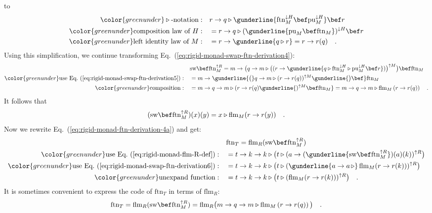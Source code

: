 to
\begin{align}
{\color{greenunder}\triangleright\text{-notation}:}\quad & r\rightarrow q\triangleright\gunderline{\text{ftn}_{M}^{\downarrow H}\bef\text{pu}_{M}^{\downarrow H}}\bef r\nonumber \\
{\color{greenunder}\text{composition law of }H:}\quad & =r\rightarrow q\triangleright(\gunderline{\text{pu}_{M}\bef\text{ftn}_{M}})^{\downarrow H}\bef r\nonumber \\
{\color{greenunder}\text{left identity law of }M:}\quad & =r\rightarrow\gunderline{q\triangleright r}=r\rightarrow r(q)\quad.\label{eq:rigid-monad-swap-ftn-derivation5}
\end{align}
Using this simplification, we continue transforming Eq.~(\ref{eq:rigid-monad-swap-ftn-derivation4}):
\begin{align*}
 & \text{sw}\bef\text{ftn}_{M}^{\uparrow R}=m\rightarrow\big(q\rightarrow m\triangleright\big((r\rightarrow\gunderline{q\triangleright\text{ftn}_{M}^{\downarrow H}\triangleright\text{pu}_{M}^{\downarrow H}\bef r})\big)^{\uparrow M}\big)\bef\text{ftn}_{M}\\
{\color{greenunder}\text{use Eq.~(\ref{eq:rigid-monad-swap-ftn-derivation5})}:}\quad & =m\rightarrow\gunderline{\big(}q\rightarrow m\triangleright(r\rightarrow r(q))^{\uparrow M}\gunderline{\big)\bef}\text{ftn}_{M}\\
{\color{greenunder}\text{composition}:}\quad & =m\rightarrow q\rightarrow m\triangleright(r\rightarrow r(q)\gunderline{)^{\uparrow M}\bef\text{ftn}_{M}}=m\rightarrow q\rightarrow m\triangleright\text{flm}_{M}\left(r\rightarrow r(q)\right)\quad.
\end{align*}
It follows that
\begin{equation}
(\text{sw}\bef\text{ftn}_{M}^{\uparrow R})(x)(y)=x\triangleright\text{flm}_{M}(r\rightarrow r(y))\quad.\label{eq:rigid-monad-swap-ftn-derivation6}
\end{equation}
Now we rewrite Eq.~(\ref{eq:rigid-monad-ftn-derivation-4a}) and
get:
\begin{align*}
 & \text{ftn}_{T}=\text{flm}_{R}(\text{sw}\bef\text{ftn}_{M}^{\uparrow R})\\
{\color{greenunder}\text{use Eq.~(\ref{eq:rigid-monad-flm-R-def})}:}\quad & =t\rightarrow k\rightarrow k\triangleright\big(t\triangleright(a\rightarrow(\gunderline{\text{sw}\bef\text{ftn}_{M}^{\uparrow R}})(a)(k))^{\uparrow R}\big)\\
{\color{greenunder}\text{use Eq.~(\ref{eq:rigid-monad-swap-ftn-derivation6})}:}\quad & =t\rightarrow k\rightarrow k\triangleright\big(t\triangleright(\gunderline{a\rightarrow a\,\triangleright}\,\text{flm}_{M}(r\rightarrow r(k)))^{\uparrow R}\big)\\
{\color{greenunder}\text{unexpand function}:}\quad & =t\rightarrow k\rightarrow k\triangleright\big(t\triangleright(\text{flm}_{M}(r\rightarrow r(k)))^{\uparrow R}\big)\quad.
\end{align*}
It is sometimes convenient to express the code of $\text{ftn}_{T}$
in terms of $\text{flm}_{R}$:
\[
\text{ftn}_{T}=\text{flm}_{R}(\text{sw}\bef\text{ftn}_{M}^{\uparrow R})=\text{flm}_{R}\big(m\rightarrow q\rightarrow m\triangleright\text{flm}_{M}\left(r\rightarrow r(q)\right)\big)\quad.
\]


